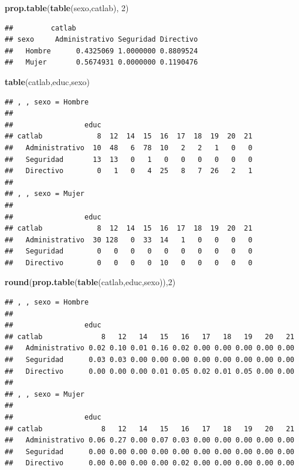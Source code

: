 \documentclass[]{book}
\newenvironment{Shaded}{\begin{snugshade}}{\end{snugshade}}
\newcommand{\KeywordTok}[1]{\textcolor[rgb]{0.13,0.29,0.53}{\textbf{#1}}}
\newcommand{\DecValTok}[1]{\textcolor[rgb]{0.00,0.00,0.81}{#1}}
\newcommand{\NormalTok}[1]{#1}
\begin{document}
\begin{Shaded}
\begin{Highlighting}[]
\KeywordTok{prop.table}\NormalTok{(}\KeywordTok{table}\NormalTok{(sexo,catlab), }\DecValTok{2}\NormalTok{)}
\end{Highlighting}
\end{Shaded}

\begin{verbatim}
##         catlab
## sexo     Administrativo Seguridad Directivo
##   Hombre      0.4325069 1.0000000 0.8809524
##   Mujer       0.5674931 0.0000000 0.1190476
\end{verbatim}

\begin{Shaded}
\begin{Highlighting}[]
\KeywordTok{table}\NormalTok{(catlab,educ,sexo)}
\end{Highlighting}
\end{Shaded}

\begin{verbatim}
## , , sexo = Hombre
## 
##                 educ
## catlab             8  12  14  15  16  17  18  19  20  21
##   Administrativo  10  48   6  78  10   2   2   1   0   0
##   Seguridad       13  13   0   1   0   0   0   0   0   0
##   Directivo        0   1   0   4  25   8   7  26   2   1
## 
## , , sexo = Mujer
## 
##                 educ
## catlab             8  12  14  15  16  17  18  19  20  21
##   Administrativo  30 128   0  33  14   1   0   0   0   0
##   Seguridad        0   0   0   0   0   0   0   0   0   0
##   Directivo        0   0   0   0  10   0   0   0   0   0
\end{verbatim}

\begin{Shaded}
\begin{Highlighting}[]
\KeywordTok{round}\NormalTok{(}\KeywordTok{prop.table}\NormalTok{(}\KeywordTok{table}\NormalTok{(catlab,educ,sexo)),}\DecValTok{2}\NormalTok{)}
\end{Highlighting}
\end{Shaded}

\begin{verbatim}
## , , sexo = Hombre
## 
##                 educ
## catlab              8   12   14   15   16   17   18   19   20   21
##   Administrativo 0.02 0.10 0.01 0.16 0.02 0.00 0.00 0.00 0.00 0.00
##   Seguridad      0.03 0.03 0.00 0.00 0.00 0.00 0.00 0.00 0.00 0.00
##   Directivo      0.00 0.00 0.00 0.01 0.05 0.02 0.01 0.05 0.00 0.00
## 
## , , sexo = Mujer
## 
##                 educ
## catlab              8   12   14   15   16   17   18   19   20   21
##   Administrativo 0.06 0.27 0.00 0.07 0.03 0.00 0.00 0.00 0.00 0.00
##   Seguridad      0.00 0.00 0.00 0.00 0.00 0.00 0.00 0.00 0.00 0.00
##   Directivo      0.00 0.00 0.00 0.00 0.02 0.00 0.00 0.00 0.00 0.00
\end{verbatim}
\end{document}
